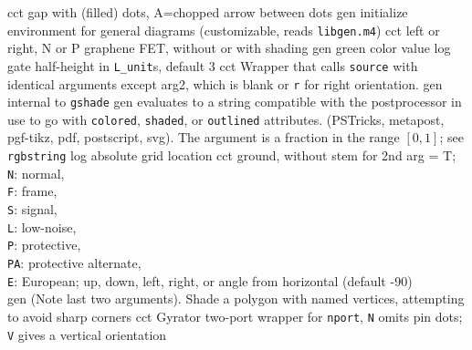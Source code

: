 %
  {cct}%
  {gap with (filled) dots, A=chopped arrow between dots}%
%
  {gen}%
  {initialize environment for general diagrams
    (customizable, reads {\tt libgen.m4})}%
%
  {cct}%
  {left or right, N or P graphene FET, without or with shading
    }%
%
  {gen}%
  {green color value}%
%
  {log}%
  {gate half-height in {\tt L\_unit}s, default 3}%
%
  {cct}%
  {Wrapper that calls {\tt source} with identical arguments except 
   arg2, which is blank or {\tt r} for right orientation.} 
%
  {gen}%
  {internal to {\tt gshade}}%
%
  {gen}%
  {evaluates to a string compatible with the postprocessor in use
   to go with {\tt colored}, {\tt shaded}, or {\tt outlined} attributes.
   (PSTricks, metapost, pgf-tikz, pdf, postscript, svg).
   The argument is a fraction in the range $[0,1]$; see {\tt rgbstring}}%
%
  {log}%
  {absolute grid location}%
%
  {cct}%
  { ground, without stem for 2nd arg = T;\\
    {\tt N}: normal,\\
    {\tt F}: frame,\\
    {\tt S}: signal,\\
    {\tt L}: low-noise,\\
    {\tt P}: protective,\\
    {\tt PA}: protective alternate,\\
    {\tt E}: European; up, down, left, right, or angle
    from horizontal (default -90) \\
   }%
%
  {gen}%
  {(Note last two arguments).  Shade a polygon with named
    vertices, attempting to avoid sharp corners}%
%
  {cct}%
  {Gyrator two-port wrapper for {\tt nport}, {\tt N} omits pin dots; {\tt V}
   gives a vertical orientation
   }%

